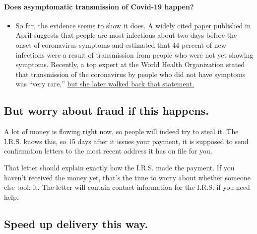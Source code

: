 \begin{itemize}
{  \paragraph{Does asymptomatic transmission of Covid-19
  happen?}\label{does-asymptomatic-transmission-of-covid-19-happen}}

  \begin{itemize}
  \tightlist
  \item
    So far, the evidence seems to show it does. A widely cited
    \href{https://www.nature.com/articles/s41591-020-0869-5}{paper}
    published in April suggests that people are most infectious about
    two days before the onset of coronavirus symptoms and estimated that
    44 percent of new infections were a result of transmission from
    people who were not yet showing symptoms. Recently, a top expert at
    the World Health Organization stated that transmission of the
    coronavirus by people who did not have symptoms was ``very rare,''
    \href{https://www.nytimes.com/2020/06/09/world/coronavirus-updates.html?action=click\&pgtype=Article\&state=default\&region=MAIN_CONTENT_3\&context=storylines_faq\#link-1f302e21}{but
    she later walked back that statement.}
  \end{itemize}
\end{itemize}

\hypertarget{but-worry-about-fraud-if-this-happens}{%
\subsection{But worry about fraud if this
happens.}\label{but-worry-about-fraud-if-this-happens}}

A lot of money is flowing right now, so people will indeed try to steal
it. The I.R.S. knows this, so 15 days after it issues your payment, it
is supposed to send confirmation letters to the most recent address it
has on file for you.

That letter should explain exactly how the I.R.S. made the payment. If
you haven't received the money yet, that's the time to worry about
whether someone else took it. The letter will contain contact
information for the I.R.S. if you need help.

\hypertarget{speed-up-delivery-this-way}{%
\subsection{Speed up delivery this
way.}\label{speed-up-delivery-this-way}}

